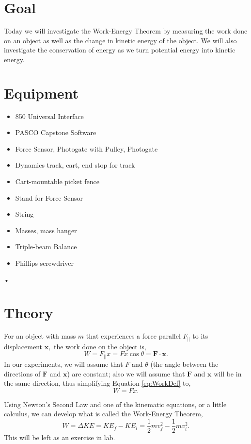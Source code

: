 \documentclass[main.tex]{subfiles}
\begin{document}
\section*{Goal}
Today we will investigate the Work-Energy Theorem by measuring the work done on an object as well as the change in kinetic energy of the object. We will also investigate the conservation of energy as we turn potential energy into kinetic energy.

\section*{Equipment}
\begin{itemize}
\item
850 Universal Interface
\item
PASCO Capstone Software
\item
Force Sensor, Photogate with Pulley, Photogate
\item
Dynamics track, cart, end stop for track
\item
Cart-mountable picket fence
\item
Stand for Force Sensor
\item
String
\item
Masses, mass hanger
\item
Triple-beam Balance
\item
Phillips screwdriver
\end{itemize}•

\section*{Theory}
For an object with mass $m$ that experiences a force parallel $F_{||}$ to its displacement $\mathbf{x},$ the work done on the object is,
\begin{equation} \label{eq:WorkDef}
W=F_{||}x=Fx\cos{\theta}=\mathbf{F}\cdot\mathbf{x}.
\end{equation}
In our experiments, we will assume that $F$ and $\theta$ (the angle between the directions of $\mathbf{F}$ and $\mathbf{x}$) are constant; also we will assume that $\mathbf{F}$ and $\mathbf{x}$ will be in the same direction, thus simplifying Equation \eqref{eq:WorkDef} to,
\begin{equation} \label{eq:Work_Simplified}
W=Fx.
\end{equation}

Using Newton's Second Law and one of the kinematic equations, or a little calculus, we can develop what is called the Work-Energy Theorem,
\begin{equation}\label{eq:WET}
W=\Delta KE=KE_{f}-KE_{i}=\frac{1}{2}mv_{f}^2-\frac{1}{2}mv_{i}^2.
\end{equation}
This will be left as an exercise in lab.
\end{document}
